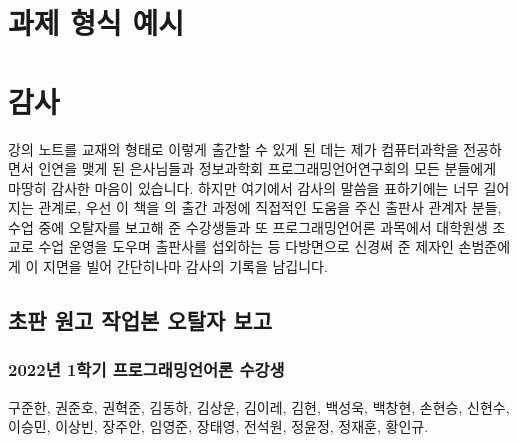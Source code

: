 \printbibliography[title=참고문헌]

\AppendixTitleToToc
\AttachAppendixTitleToSecnum

\appendix
\appendixpage*


\section{과제 형식 예시}


\newpage

\section{감사}
강의 노트를 교재의 형태로 이렇게 출간할 수 있게 된 데는 제가 컴퓨터과학을 전공하면서
인연을 맺게 된 은사님들과 정보과학회 프로그래밍언어연구회의 모든 분들에게 마땅히 감사한 마음이 있습니다.
하지만 여기에서 감사의 말씀을 표하기에는 너무 길어지는 관계로,
우선 이 책을 의 출간 과정에 직접적인 도움을 주신 출판사 관계자 분들,
수업 중에 오탈자를 보고해 준 수강생들과 또 프로그래밍언어론 과목에서
대학원생 조교로 수업 운영을 도우며 출판사를 섭외하는 등 다방면으로
신경써 준 제자인 손범준에게 이 지면을 빌어 간단히나마 감사의 기록을 남깁니다.

\subsection{초판 원고 작업본 오탈자 보고}
\subsubsection{2022년 1학기 프로그래밍언어론 수강생}
구준한,
권준호,
권혁준,
김동하,
김상운,
김이레,
김현,
백성욱,
백창현,
손현승,
신현수,
이승민,
이상빈,
장주안,
임영준,
장태영,
전석원,
정윤정,
정재훈,
황인규.

\begin{comment}
\newpage

\section{다음 판에 추가할지 고려중인 주제}
\subsection{Control}
Continuation-Passing Style,
Delimited Continuations,
Coroutines, Exceptions, Async-Await,
Algebraic Effects,
Functor/Applicative/Monad/Monoid/...

\url{https://www.microsoft.com/en-us/research/wp-content/uploads/2016/08/algeff-tr-2016-v2.pdf}

\subsection{Staged Computation}
Interpreter vs. Compiler, Futamura Projections, Partial Evaluation

\end{comment}


